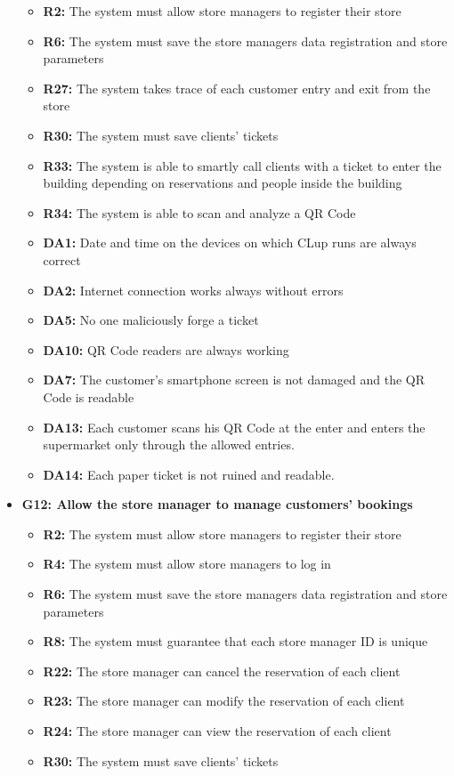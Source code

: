 \documentclass{article}
\begin{document}
\begin{itemize}
			\begin{itemize}
				\item {\bfseries R2:} The system must allow store managers to register their store
				\item {\bfseries R6:} The system must save the store managers data registration and store parameters
				\item {\bfseries R27:} The system takes trace of each customer entry and exit from the store
				\item {\bfseries R30:} The system must save clients’ tickets				
				\item {\bfseries R33:} The system is able to smartly call clients with a ticket to enter the building depending on reservations and people inside the building
				\item {\bfseries R34:} The system is able to scan and analyze a QR Code


				\item {\bfseries DA1:} Date and time on the devices on which CLup runs are always correct
				\item {\bfseries DA2:} Internet connection works always without errors
				\item {\bfseries DA5:} No one maliciously forge a ticket
				\item {\bfseries DA10:} QR Code readers are always working
				\item{\bfseries DA7:} The customer’s smartphone screen is not damaged and the QR Code is
readable
				\item {\bfseries DA13:} Each customer scans his QR Code at the enter and enters the supermarket only through the allowed entries.				
				\item {\bfseries DA14:} Each paper ticket is not ruined and readable.
				\end{itemize}

\item {\bfseries G12: Allow the store manager to manage customers’ bookings}	

			\begin{itemize}
				\item {\bfseries R2:} The system must allow store managers to register their store
				\item {\bfseries R4:} The system must allow store managers to log in
				\item {\bfseries R6:} The system must save the store managers data registration and store parameters
				\item {\bfseries R8:} The system must guarantee that each store manager ID is unique
				\item {\bfseries R22:}  The store manager can cancel the reservation of each client
				\item {\bfseries R23:} The store manager can modify the reservation of each client
				\item {\bfseries R24:} The store manager can view the reservation of each client
				\item {\bfseries R30:} The system must save clients’ tickets		




\end{itemize}
\end{itemize}
\end{document}
